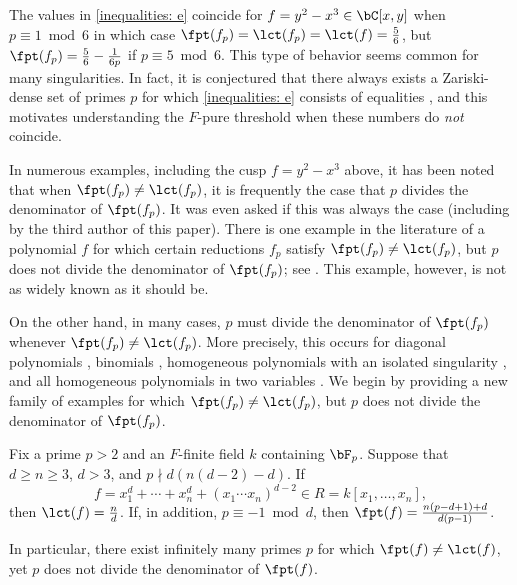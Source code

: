\documentclass[11pt]{amsart}
\begin{document}
The values in \eqref{inequalities: e} coincide for $f = y^2-x^3 \in \bC[x,y]$ when $p \equiv 1 \bmod 6$ in which case $\fpt(f_p) = \lct(f_p) = \lct(f) = {5 \over 6}$, but $\fpt(f_p) = {5 \over 6} - {1 \over 6p}$ if $p \equiv 5 \bmod 6$.  This type of behavior seems common for many singularities.  In fact,
it is conjectured that there always exists a Zariski-dense set of primes $p$ for which \eqref{inequalities: e} consists of equalities \cite{MustataSrinivasOrdinary}, and this motivates understanding the $F$-pure threshold when these numbers do \emph{not} coincide.

In numerous examples, including the cusp $f = y^2-x^3$ above, it has been noted that when $\fpt(f_p) \neq \lct(f_p)$,
it is frequently the case that $p$ divides the denominator of $\fpt(f_p)$.
It was even asked if this was always the case (including by the third author of this paper).
There is one example in the literature of a polynomial $f$ for which certain reductions $f_p$ satisfy $\fpt(f_p) \neq \lct(f_p)$, but $p$ does not divide the denominator of $\fpt(f_p)$; see \cite[Example 4.5]{MustataTakagiWatanabeFThresholdsAndBernsteinSato}.  This example, however, is not as widely known as it should be.

On the other hand, in many cases, $p$ must divide the denominator of $\fpt(f_p)$ whenever
$\fpt(f_p) \neq \lct(f_p)$.  More precisely, this occurs for diagonal polynomials \cite{HernandezFInvariantsOfDiagonalHyp}, binomials \cite{HernandezFPureThresholdOfBinomial}, homogeneous polynomials with an isolated singularity \cite{BhattSinghCalabiYau, HernandezNunezWittZhangHomogeneous}, and all homogeneous polynomials in two variables \cite{HernandezTeixeiraTwoVariable}.  We begin by providing a new family of examples for which $\fpt(f_p) \neq \lct(f_p)$, but $p$ does not divide the denominator of $\fpt(f_p)$.

\begin{theoremA*}
Fix a prime $p > 2$ and an $F$-finite field $k$ containing $\bF_p$.  Suppose that $d \geq n \geq 3$, $d > 3$, and  $p \nmid d (n(d-2) - d)$.  If
\[f = x_1^d + \cdots + x_n^d + (x_1 \cdots x_n)^{d-2} \in R = k[x_1, \ldots, x_n],\] then $\lct(f) = {n  \over d}$.
If, in addition, $p \equiv -1 \bmod d$, then $\fpt(f) = {n (p-d+1)+d \over d(p-1)}$.

In particular, there exist infinitely many primes $p$ for which $\fpt(f) \neq \lct(f)$, yet $p$ does not divide the denominator of $\fpt(f)$.
\end{theoremA*}
\end{document}

